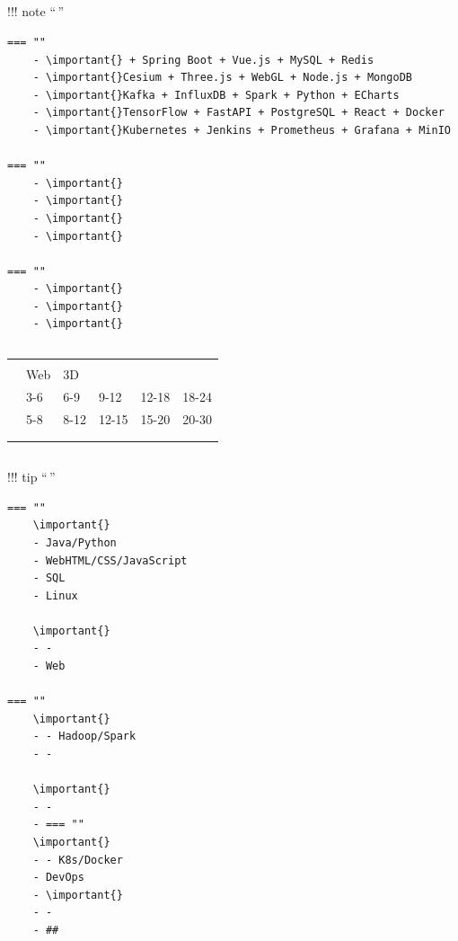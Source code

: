 \hypertarget{section-3}{%
\subsection{}\label{section-3}}

!!! note ``\,''

\begin{verbatim}
=== ""
    - \important{} + Spring Boot + Vue.js + MySQL + Redis
    - \important{}Cesium + Three.js + WebGL + Node.js + MongoDB  
    - \important{}Kafka + InfluxDB + Spark + Python + ECharts
    - \important{}TensorFlow + FastAPI + PostgreSQL + React + Docker
    - \important{}Kubernetes + Jenkins + Prometheus + Grafana + MinIO
    
=== ""
    - \important{}
    - \important{}
    - \important{}
    - \important{}
    
=== ""
    - \important{}
    - \important{}
    - \important{}
\end{verbatim}

\hypertarget{section-4}{%
\subsection{}\label{section-4}}

\begin{longtable}[]{@{}llllll@{}}
\toprule\noalign{}
\endhead
\bottomrule\noalign{}
\endlastfoot
\important{} & & & & & \\
\important{} & Web & 3D & & & \\
\important{} & 3-6 & 6-9 & 9-12 & 12-18 & 18-24 \\
\important{} & 5-8 & 8-12 & 12-15 & 15-20 & 20-30 \\
\important{} & & & & & \\
\important{} & & & & & \\
\end{longtable}

\hypertarget{section-5}{%
\subsection{}\label{section-5}}

!!! tip ``\,''

\begin{verbatim}
=== ""
    \important{}
    - Java/Python
    - WebHTML/CSS/JavaScript
    - SQL
    - Linux
    
    \important{}
    - - 
    - Web
    
=== ""
    \important{}
    - - Hadoop/Spark
    - - 
    
    \important{}
    - - 
    - === ""
    \important{}
    - - K8s/Docker
    - DevOps
    - \important{}
    - - 
    - ## 
\end{verbatim}

